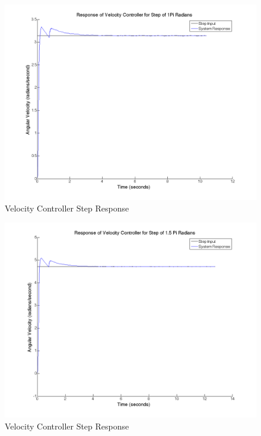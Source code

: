 \documentclass{article}
\theoremstyle{plain}
\theoremstyle{definition}
\theoremstyle{remark}
\begin{document}
\begin{figure}[htb]
\begin{center}
\includegraphics[width = 12cm]{velstepPi.png}
\caption{Velocity Controller Step Response}
\label{q6_2}
\end{center}
\end{figure}

\begin{figure}[htb]
\begin{center}
\includegraphics[width = 12cm]{velstep1_5Pi.png}
\caption{Velocity Controller Step Response}
\label{q6_3}
\end{center}
\end{figure}
\end{document}

